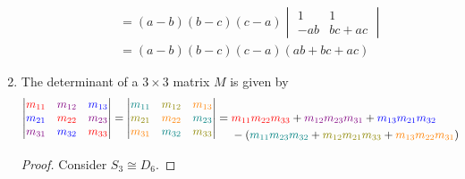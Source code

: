 \documentclass[fleqn,a4paper,11pt]{article}
\begin{document}
\begin{enumerate}[label=\textbf{\arabic*.}]
\begin{alignat*}
    && &= (a - b)(b - c)(c - a)\begin{vmatrix}
      1 & 1 \\
      -ab & bc + ac
     \end{vmatrix} \\
    && &= (a - b)(b - c)(c - a)(ab + bc + ac)
   \end{alignat*}
  \item
   \begin{lemma}
    The determinant of a \(3 \times 3\) matrix \(M\) is given by
    \begin{align*}
     \begin{vmatrix}
      \color{red}m_{11} & \color{violet}m_{12} & \color{blue}m_{13} \\
      \color{blue}m_{21} & \color{red}m_{22} & \color{violet}m_{23} \\
      \color{violet}m_{31} & \color{blue}m_{32} & \color{red}m_{33}
     \end{vmatrix} =
     \begin{vmatrix}
      \color{teal}m_{11} & \color{olive}m_{12} & \color{orange}m_{13} \\
      \color{olive}m_{21} & \color{orange}m_{22} & \color{teal}m_{23} \\
      \color{orange}m_{31} & \color{teal}m_{32} & \color{olive}m_{33}
     \end{vmatrix} &=
     \begin{aligned}[t]
      &  \textcolor{red}{m_{11} m_{22} m_{33}}
       + \textcolor{violet}{m_{12} m_{23} m_{31}}
       + \textcolor{blue}{m_{13} m_{21} m_{32}} \\
      &-(\textcolor{teal}{m_{11} m_{23} m_{32}}
       + \textcolor{olive}{m_{12} m_{21} m_{33}}
       + \textcolor{orange}{m_{13} m_{22} m_{31}})
     \end{aligned}
    \end{align*}
   \end{lemma}
   \begin{proof}
    Consider \(S_3 \cong D_6\).
   \end{proof}
 \end{enumerate}
\end{document}
